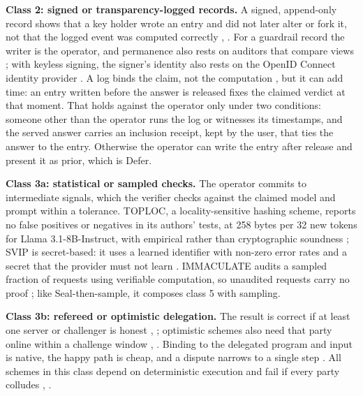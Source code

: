\documentclass[11pt]{article}
\begin{document}
\textbf{Class 2: signed or transparency-logged records.} A signed, append-only record shows that a key holder wrote an entry and did not later alter or fork it, not that the logged event was computed correctly \cite{C16}, \cite{C18}. For a guardrail record the writer is the operator, and permanence also rests on auditors that compare views \cite{C17}; with keyless signing, the signer's identity also rests on the OpenID Connect identity provider \cite{C20}. A log binds the claim, not the computation \cite{C17}, but it can add time: an entry written before the answer is released fixes the claimed verdict at that moment. That holds against the operator only under two conditions: someone other than the operator runs the log or witnesses its timestamps, and the served answer carries an inclusion receipt, kept by the user, that ties the answer to the entry. Otherwise the operator can write the entry after release and present it as prior, which is Defer.

\textbf{Class 3a: statistical or sampled checks.} The operator commits to intermediate signals, which the verifier checks against the claimed model and prompt within a tolerance. TOPLOC, a locality-sensitive hashing scheme, reports no false positives or negatives in its authors' tests, at 258 bytes per 32 new tokens for Llama 3.1-8B-Instruct, with empirical rather than cryptographic soundness \cite{C11}; SVIP is secret-based: it uses a learned identifier with non-zero error rates and a secret that the provider must not learn \cite{C12}. IMMACULATE audits a sampled fraction of requests using verifiable computation, so unaudited requests carry no proof \cite{C13}; like Seal-then-sample, it composes class 5 with sampling.

\textbf{Class 3b: refereed or optimistic delegation.} The result is correct if at least one server or challenger is honest \cite{C6}, \cite{C10}; optimistic schemes also need that party online within a challenge window \cite{C8}, \cite{C9}. Binding to the delegated program and input is native, the happy path is cheap, and a dispute narrows to a single step \cite{C9}. All schemes in this class depend on deterministic execution and fail if every party colludes \cite{C9}, \cite{C10}.
\end{document}
